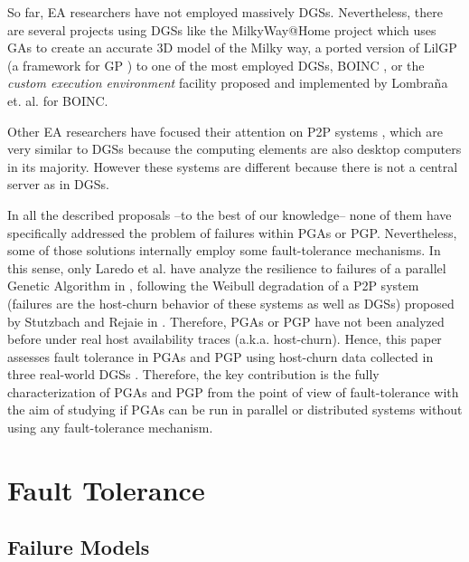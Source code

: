 \documentclass[graybox]{sty/svmult}
\begin{document}
So far, EA researchers have not employed massively DGSs. Nevertheless, there are several projects using DGSs like 
the MilkyWay@Home project \cite{milkywayathome} which uses GAs to create an accurate 3D model of the Milky way, a ported version 
of LilGP \cite{maeb-2007-boinc}(a framework for GP \cite{lilgp}) to one of the most employed DGSs, BOINC
\cite{boinc-paper}, or the \emph{custom execution environment} facility proposed and implemented by Lombraña et. al. \cite{ibergrid-2008,pdp-2009} 
for BOINC.

Other EA researchers have focused their attention on P2P systems \cite{juanlu-ppsn}, which are very similar to DGSs because
the computing elements are also desktop computers in its majority. However these systems are different because there is not a
central server as in DGSs.

In all the described proposals --to the best of our knowledge-- none of them have specifically
addressed the problem of failures within PGAs or PGP. Nevertheless, some of those solutions internally employ some fault-tolerance
mechanisms. In this sense, only Laredo et al. have analyze the resilience to failures of a parallel Genetic Algorithm 
in \cite{laredo08:churn}, following the Weibull degradation of a P2P system (failures are the host-churn behavior of these
systems as well as DGSs) proposed by Stutzbach and Rejaie in \cite{Stutzbach06Understanding}. 
Therefore, PGAs or PGP have not been analyzed before under real host availability traces
(a.k.a. host-churn). Hence, this paper assesses fault tolerance in PGAs and PGP using host-churn data collected in
three real-world DGSs \cite{traces-dgc}.
Therefore, the key contribution is the fully characterization of PGAs and PGP from the point of view of fault-tolerance with the
aim of studying if PGAs can be run in parallel or distributed systems without using any fault-tolerance mechanism. 

\section{Fault Tolerance}
\label{faulttolerance}

\subsection{Failure Models}
\end{document}
